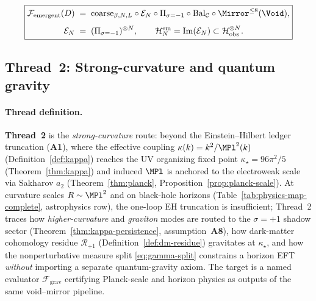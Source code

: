\begin{equation}\label{eq:thread-1-pipeline}
  \boxed{%
  \begin{aligned}
    \mathcal{F}_{\mathrm{emergent}}(D)
    \;&=\;
    \mathrm{coarse}_{\beta,N,L}\circ
    \mathcal{E}_N\circ
    \Pi_{\sigma=-1}\circ
    \mathrm{Bal}_{\mathcal{C}}\circ
    \Mirror^{\leq 8}(\Void),\\[4pt]
    \mathcal{E}_N
    \;&=\;
    (\Pi_{\sigma=-1})^{\otimes N},
    \qquad
    \mathcal{H}_N^{\mathrm{em}}=\mathrm{Im}(\mathcal{E}_N)
    \subset
    \mathcal{H}_{\mathrm{obs}}^{\otimes N}.
  \end{aligned}}
\end{equation}

\subsection{Thread~2: Strong-curvature and quantum gravity}
\label{sec:thread-2}

\paragraph{Thread definition.}
\textbf{Thread~2} is the \emph{strong-curvature} route: beyond the
Einstein--Hilbert ledger truncation (\textbf{A1}), where the effective
coupling $\kappa(k)=k^2/\MPl^2(k)$ (Definition~\ref{def:kappa}) reaches the
UV organizing fixed point $\kappa_\star=96\pi^2/5$
(Theorem~\ref{thm:kappa}) and induced $\MPl$ is anchored to the electroweak
scale via Sakharov $a_2$ (Theorem~\ref{thm:planck},
Proposition~\ref{prop:planck-scale}). At curvature scales $R\sim\MPl^2$ and on
black-hole horizons (Table~\ref{tab:physics-map-complete}, astrophysics row),
the one-loop EH truncation is insufficient; Thread~2 traces how
\emph{higher-curvature} and \emph{graviton} modes are routed to the
$\sigma=+1$ shadow sector (Theorem~\ref{thm:kappa-persistence},
assumption~\textbf{A8}), how dark-matter cohomology residue
$\mathcal{R}_{+1}$ (Definition~\ref{def:dm-residue}) gravitates at
$\kappa_\star$, and how the nonperturbative measure split
\eqref{eq:gamma-split} constrains a horizon EFT \emph{without} importing a
separate quantum-gravity axiom. The target is a named evaluator
$\mathcal{F}_{\mathrm{grav}}$ certifying Planck-scale and horizon physics as
outputs of the same void--mirror pipeline.

